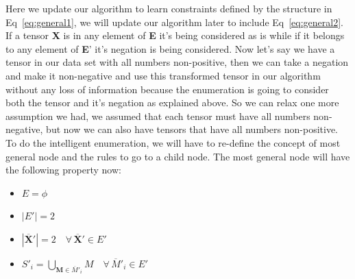 \documentclass{article}
\newcommand{\TX}{\textbf{X}\xspace}
\newcommand{\TZ}{\textbf{Z}\xspace}
\newcommand{\TM}{\textbf{M}\xspace}
\newcommand{\TE}{\textbf{E}\xspace}
\begin{document}
Here we update our algorithm to learn constraints defined by the structure in Eq~\ref{eq:general1}, we will update our algorithm later to include Eq~\ref{eq:general2}.   
If a tensor \TX is in any element of \TE it's being considered as is while if it belongs to any element of \TE' it's negation is being considered. 
Now let's say we have a tensor in our data set with all numbers non-positive, then we can take a negation and make it non-negative and use this transformed tensor in our algorithm without any loss of information because the enumeration is going to consider both the tensor and it's negation as explained above.
So we can relax one more assumption we had, we assumed that each tensor must have all numbers non-negative, but now we can also have tensors that have all numbers non-positive. To do the intelligent enumeration, we will have to re-define the concept of most general node and the rules to go to a child node.
The most general node will have the following property now:
\begin{itemize}
\item $E=\phi$
\item $|E'|=2$
\item $|\overline{\TX}'|=2 \quad \forall \, \overline{\TX}' \in E'$ 
\item $\displaystyle S'_i = \bigcup_{\TM \in \overline{M}'_i} M \quad \forall \, \overline{M}'_i \in E'$
\end{itemize}
\end{document}
